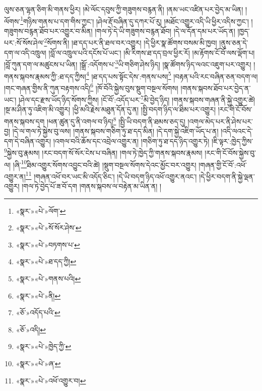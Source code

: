 ལུས་ཅན་ལྷན་ཅིག་མི་གནས་ཕྱིར། །མེ་ལོང་དབུས་ཀྱི་གཟུགས་བརྙན་ནི། །ནམ་ཡང་འཛིན་པར་བྱེད་མ་ཡིན། །ལོགས་\footnote{«སྣར་»«པེ་»ལོག་}གཉིས་གནས་པ་དག་གིས་ཀྱང་། །ཤེལ་རྡོ་བཞིན་དུ་དཀར་པོ་རུ། །མཐོང་འགྱུར་འདི་ཡི་ཕྱིར་འདིས་ཀྱང་། །གཟུགས་བརྙན་ཐོབ་པར་འགྱུར་བ་མིན། །གལ་ཏེ་དེ་ཡི་གཟུགས་བརྙན་ཐོབ། །དེ་ལ་དོན་དམ་པར་ཡོད་ན། །ཁྱད་པར་:སོ་སོས་ཤེལ་\footnote{«སྣར་»«པེ་»སོ་སོར་ཤེས་}སོགས་ནི། །ཐ་དད་པར་ནི་ཐལ་བར་འགྱུར། །དེ་ཕྱིར་སྣ་ཚོགས་བསམ་མི་ཁྱབ། །ནུས་ཅན་དེ་དག་ལ་འདི་འཁྲུལ། །བློ་ལ་འཁྲུལ་པའི་དངོས་པོ་ཡང་། །མི་རིགས་ཐ་དད་བྲལ་ཕྱིར་རོ། །མ་རྟོགས་ངོ་བོ་ལས་ལྡོག་པ། །བློ་ཀུན་དག་ལ་མཚུངས་པ་ཡིན། །སྒྲོ་:འདོགས་པ་\footnote{«སྣར་»«པེ་»བཏགས་པ་}ཡི་གཅིག་ཤེས་ཉིད། །སྣ་ཚོགས་ཉིད་ལའང་འཇུག་པར་འགྱུར། །གནས་སྐབས་རྣམས་ཀྱི་:ཐ་དད་ཀྱིས།\footnote{«སྣར་»«པེ་»ཐ་དད་ཀྱི།} །ཐ་དད་པས་སྟོང་དེས་:གནས་པས།\footnote{«སྣར་»«པེ་»གནས་པའི།} །བརྟན་པའི་རང་བཞིན་ཅན་བདག་ལ། །གང་གཞན་གྱིས་ནི་ཀུན་བརྟགས་འདི།\footnote{«སྣར་»«པེ་»ནི།} །ཁོ་བོའི་སྐྱེས་བུས་སྡུག་བསྔལ་སོགས། །གནས་སྐབས་ཐོབ་པར་བྱེད་ན་ཡང་། །ཤེལ་དང་རྫས་ཡོད་ཉིད་སོགས་ཀྱིས། །ངོ་བོ་:འདོད་པར་\footnote{«ཅོ་»འདོད་པའི་}མི་བྱེད་ཉིད། །གནས་སྐབས་གཞན་ནི་སྐྱེ་འགྱུར་ཚེ། །སྔ་མ་ཤིན་ཏུ་འཇིག་མི་འགྱུར། །ཕྱི་མའི་རྗེས་མཐུན་དོན་དུ་ན། །སྤྱི་བདག་ཉིད་ལ་ཐིམ་པར་འགྱུར། །རང་གི་ངོ་བོས་གནས་སྐབས་དག །ཕན་ཚུན་དུ་ནི་འགལ་བ་ཉིད།\footnote{«ཅོ་»འདི།} །སྤྱི་ཡི་བདག་ནི་ཐམས་ཅད་དུ། །འགལ་མེད་པར་ནི་ཤེས་པར་བྱ། །དེ་ལ་གལ་ཏེ་སྐྱེས་བུ་ལས། །གནས་སྐབས་གཅིག་ཏུ་ཐ་དད་མིན། །དེ་དག་སྐྱེ་འཇིག་ཡོད་པ་ན། །འདི་ལའང་དེ་དག་དེ་བཞིན་འགྱུར། །འགལ་བའི་ཆོས་དང་འབྲེལ་འགྱུར་ན། །གཅིག་ཏུ་ཐ་དད་ཉིད་འགྱུར་ཏེ། །ཇི་ལྟར་:ཁྱེད་ཀྱིས་\footnote{«སྣར་»«པེ་»ཁྱེད་ཀྱི་}སྐྱེས་བུ་རྣམས། །རང་བདག་སོ་སོར་ངེས་པ་བཞིན། །གལ་ཏེ་ཁྱེད་ཀྱི་གནས་སྐབས་རྣམས། །རང་གི་ངོ་བོས་སྐྱེས་བུ་ལ། །ཞི་\footnote{«སྣར་»«པེ་»ཞ་}ཐིམ་འགྱུར་སོགས་འབྱུང་བའི་ཚེ། །སྡུག་བསྔལ་སོགས་དེའང་མྱོང་བར་འགྱུར། །གཞན་གྱི་ངོ་བོ་:འཕོ་འགྱུར་ན།\footnote{«སྣར་»«པེ་»འཕོ་འགྱུར་བ།} །གཞན་འཕོ་བར་ཡང་མི་འདོད་ཅིང་། །དེ་ཡི་བདག་ཉིད་འཕོ་འགྱུར་ནའང་། །དེ་ཕྱིར་བདག་ནི་སྐྱེ་ལྡན་འགྱུར། །གལ་ཏེ་བྱེད་པོ་ཟ་བོ་དག །གནས་སྐབས་ལ་བརྟེན་མ་ཡིན་ན། །

